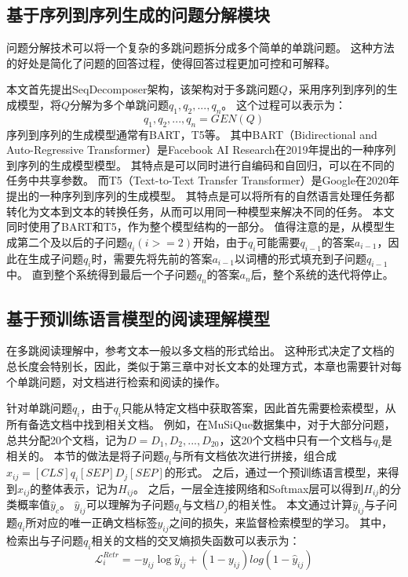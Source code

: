 \subsection{基于序列到序列生成的问题分解模块}
问题分解技术可以将一个复杂的多跳问题拆分成多个简单的单跳问题。
这种方法的好处是简化了问题的回答过程，使得回答过程更加可控和可解释。

本文首先提出SeqDecomposer架构，该架构对于多跳问题$Q$，采用序列到序列的生成模型，将$Q$分解为多个单跳问题$q_1,q_2,...,q_n$。
这个过程可以表示为：
\begin{equation}
    q_1,q_2,...,q_n = GEN(Q)
\end{equation}
序列到序列的生成模型通常有BART，T5等。
其中BART（Bidirectional and Auto-Regressive Transformer）是Facebook AI Research在2019年提出的一种序列到序列的生成模型模型。
其特点是可以同时进行自编码和自回归，可以在不同的任务中共享参数。
而T5（Text-to-Text Transfer Transformer）是Google在2020年提出的一种序列到序列的生成模型。
其特点是可以将所有的自然语言处理任务都转化为文本到文本的转换任务，从而可以用同一种模型来解决不同的任务。
本文同时使用了BART和T5，作为整个模型结构的一部分。
值得注意的是，从模型生成第二个及以后的子问题$q_i(i>=2)$开始，由于$q_i$可能需要$q_{i-1}$的答案$a_{i-1}$，因此在生成子问题$q_i$时，需要先将先前的答案$a_{i-1}$以词槽的形式填充到子问题$q_{i-1}$中。
直到整个系统得到最后一个子问题$q_{n}$的答案$a_{n}$后，整个系统的迭代将停止。

\subsection{基于预训练语言模型的阅读理解模型}
在多跳阅读理解中，参考文本一般以多文档的形式给出。
这种形式决定了文档的总长度会特别长，因此，类似于第三章中对长文本的处理方式，本章也需要针对每个单跳问题，对文档进行检索和阅读的操作。

针对单跳问题$q_i$，由于$q_i$只能从特定文档中获取答案，因此首先需要检索模型，从所有备选文档中找到相关文档。
例如，在MuSiQue数据集中，对于大部分问题，总共分配20个文档，记为$D={D_1, D_2, ..., D_20}$，这20个文档中只有一个文档与$q_i$是相关的。
本节的做法是将子问题$q_i$与所有文档依次进行拼接，组合成$x_{ij}=[CLS]q_i[SEP]D_j[SEP]$的形式。
之后，通过一个预训练语言模型，来得到$x_{ij}$的整体表示，记为$H_{ij}$。
之后，一层全连接网络和Softmax层可以得到$H_{ij}$的分类概率值$\hat y_c$。
$\hat y_{ij}$可以理解为子问题$q_i$与文档$D_j$的相关性。
本文通过计算$\hat y_{ij}$与子问题$q_i$所对应的唯一正确文档标签$y_{ij}$之间的损失，来监督检索模型的学习。
其中，检索出与子问题$q_i$相关的文档的交叉熵损失函数可以表示为：
\begin{equation}
    \mathcal  L^{Retr}_{i}  = -y_{ij}\log\hat y_{ij}+(1-y_{ij})log(1-\hat y_{ij})
\end{equation}

